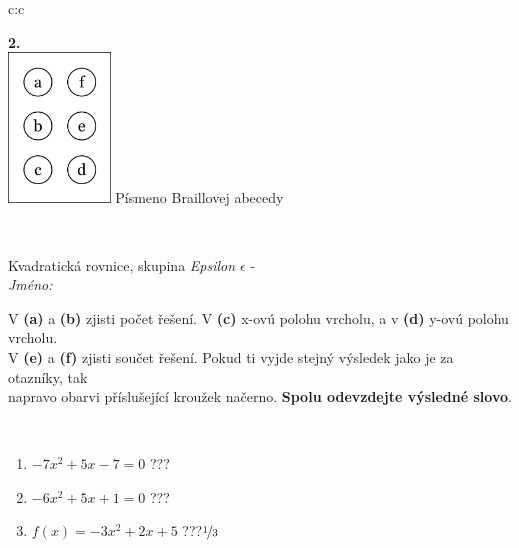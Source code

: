 \documentclass[10pt]{report}
\begin{document}
\begin{tabular}{c:c}
\begin{minipage}[c][104.5mm][t]{0.5\linewidth}
\begin{center}
\begin{minipage}{0.20\linewidth}
\begin{center}
{\Huge\bfseries 2.} \\[2mm]
\includegraphics[height=40mm]{../images/braille.png}
{\small Písmeno Braillovej abecedy}
\end{center}
\end{minipage}
\end{center}
\end{minipage}
\\ \hdashline
\begin{minipage}[c][104.5mm][t]{0.5\linewidth}
\begin{center}
\vspace{7mm}
{\huge Kvadratická rovnice, skupina \textit{Epsilon $\epsilon$} -}\\[5mm]
\textit{Jméno:}\phantom{xxxxxxxxxxxxxxxxxxxxxxxxxxxxxxxxxxxxxxxxxxxxxxxxxxxxxxxxxxxxxxxxx}\\[5mm]
\begin{minipage}{0.95\linewidth}
\begin{center}
V \textbf{(a)} a \textbf{(b)} zjisti počet řešení. V \textbf{(c)} x-ovú polohu vrcholu, a v \textbf{(d)} y-ovú polohu vrcholu.\\V \textbf{(e)} a \textbf{(f)} zjisti součet řešení. Pokud ti vyjde stejný výsledek jako je za otazníky, tak\\napravo obarvi příslušející kroužek načerno. \textbf{Spolu odevzdejte výsledné slovo}.
\end{center}
\end{minipage}
\\[1mm]
\begin{minipage}{0.79\linewidth}
\begin{center}
\begin{varwidth}{\linewidth}
\begin{enumerate}
\Large
\item $-7x^2+5x-7=0$\quad \dotfill\; ???\;\dotfill {}
\item $-6x^2+5x+1=0$\quad \dotfill\; ???\;\dotfill {}
\item $f(x)=-3x^2+2x+5$\quad \dotfill\; ???\;\dotfill \quad $\nicefrac{1}{3}$

\end{enumerate}
\end{varwidth}
\end{center}
\end{minipage}
\end{center}
\end{minipage}
\end{tabular}
\end{document}
